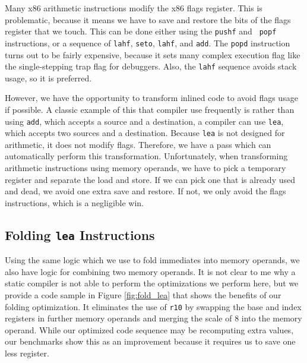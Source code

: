 Many x86 arithmetic instructions modify the x86 flags register.  This is
problematic, because it means we have to save and restore the bits of the flags
register that we touch.  This can be done either using the {\tt pushf} and {\tt
popf} instructions, or a sequence of {\tt lahf}, {\tt seto}, {\tt lahf}, and
{\tt add}.  The {\tt popd} instruction turns out to be fairly expensive, because
it sets many complex execution flag like the single-stepping trap flag for
debuggers.  Also, the {\tt lahf} sequence avoids stack usage, so it is
preferred.

However, we have the opportunity to transform inlined code to avoid flags usage
if possible.  A classic example of this that compiler use frequently is rather
than using {\tt add}, which accepts a source and a destination, a compiler can
use {\tt lea}, which accepts two sources and a destination.  Because {\tt lea}
is not designed for arithmetic, it does not modify flags.  Therefore, we have a
pass which can automatically perform this transformation.  Unfortunately, when
transforming arithmetic instructions using memory operands, we have to pick a
temporary register and separate the load and store.  If we can pick one that is
already used and dead, we avoid one extra save and restore.  If not, we only
avoid the flags instructions, which is a negligible win.

\subsection{Folding {\tt lea} Instructions}

Using the same logic which we use to fold immediates into memory operands, we
also have logic for combining two memory operands.  It is not clear to me why a
static compiler is not able to perform the optimizations we perform here, but we
provide a code sample in Figure \ref{fig:fold_lea} that shows the benefits of
our folding optimization.  It eliminates the use of {\tt r10} by swapping the
base and index registers in further memory operands and merging the scale of 8
into the memory operand.  While our optimized code sequence may be recomputing
extra values, our benchmarks show this as an improvement because it requires us
to save one less register.

